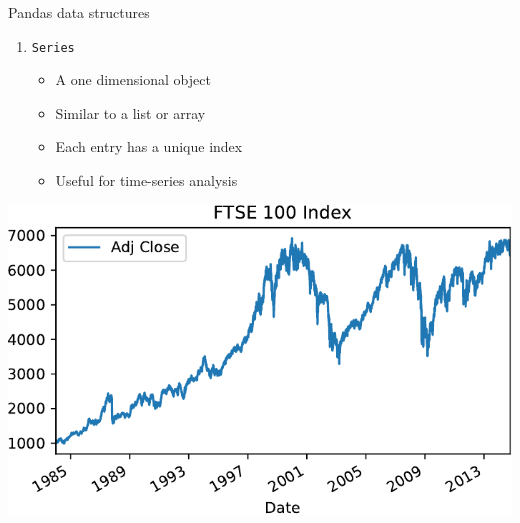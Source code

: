 \documentclass[pdf]{beamer}
\begin{document}
\begin{frame}{Pandas data structures}

\begin{enumerate}
	\item \texttt{Series}
	\begin{itemize}
		\item A one dimensional object
		\item Similar to a list or array
		\item Each entry has a unique index
		\item Useful for time-series analysis
	\end{itemize}
\end{enumerate}

\begin{center}
	\includegraphics[width=.7\textwidth]{ftse1.pdf}
\end{center}

\end{frame}
\end{document}
